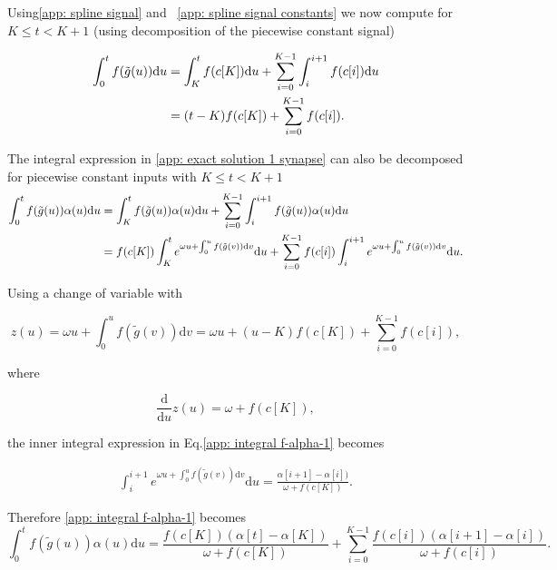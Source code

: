 \documentclass{article}
\begin{document}
Using\eqref{app: spline signal} and ~\eqref{app: spline signal constants} we now compute for $K \leq t < K+1$ (using decomposition of the piecewise constant signal)

\begin{align}\label{app: integral sigmoid}
\int_0^tf(\tilde{g}(u))\mathrm{d}u
 &=  \int_K^{t} f(c[K]) \mathrm{d}u + \sum_{i=0}^{K-1} \int_i^{i+1} f(c[i]) \mathrm{d}u \notag \\
&= (t - K)f(c[K]) + \sum_{i=0}^{K-1} f(c[i]).
\end{align}

The integral expression in \eqref{app: exact solution 1 synapse} can also be decomposed for piecewise constant inputs with $K \leq t < K+1$   
\begin{align}\label{app: integral f-alpha-1}
   \int_0^tf(\tilde{g}(u))\alpha(u)\mathrm{d}u
&= \int_K^t f(\tilde{g}(u))\alpha(u)\mathrm{d}u + \sum_{i=0}^{K-1}  \int_i^{i+1} f(\tilde{g}(u))\alpha(u)\mathrm{d}u \notag \\
&= f(c[K])\int_K^t e^{\omega u + \int_0^u f(\tilde{g}(v))\mathrm{d}v} \mathrm{d}u + \sum_{i=0}^{K-1}  f(c[i]) \int_i^{i+1} e^{\omega u + \int_0^u f(\tilde{g}(v))\mathrm{d}v} \mathrm{d}u.
\end{align}


Using a change of  variable with 
 
\begin{equation}
z(u) = \omega u + \int_0^u f(\tilde{g}(v))\mathrm{d}v = \omega u + (u - K)f(c[K]) + \sum_{i=0}^{K-1} f(c[i]),
\end{equation}

where 

\begin{equation}
\frac{\mathrm{d}}{\mathrm{d}u}z(u) = \omega + f(c[K]),   
\end{equation}

the inner integral expression in Eq.\eqref{app: integral f-alpha-1} becomes

\begin{align}
\int_i^{i+1}  e^{\omega u + \int_0^u f(\tilde{g}(v))\mathrm{d}v} \mathrm{d}u 
= \frac{\alpha[i+1]-\alpha[i])}{\omega + f(c[K])}.
\end{align}

Therefore \eqref{app: integral f-alpha-1} becomes
\begin{equation} \label{app: integral f-alpha-2} 
\int_0^tf(\tilde{g}(u))\alpha(u)\mathrm{d}u
= \frac{f(c[K])(\alpha[t]-\alpha[K])}{\omega+f(c[K])} + \sum_{i=0}^{K-1}\frac{f(c[i])(\alpha[i+1]-\alpha[i])}{\omega+f(c[i])}.
\end{equation}
\end{document}
